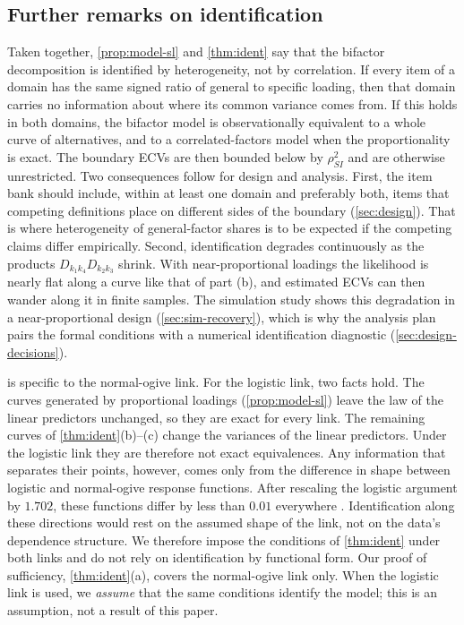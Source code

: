 \subsection{Further remarks on identification}\label{app:pm-remarks-ident}

\begin{remark}\label{rem:id-heterogeneity}
Taken together, \cref{prop:model-sl} and \cref{thm:ident} say that the bifactor decomposition is identified by heterogeneity, not by correlation. If every item of a domain has the same signed ratio of general to specific loading, then that domain carries no information about where its common variance comes from. If this holds in both domains, the bifactor model is observationally equivalent to a whole curve of alternatives, and to a correlated-factors model when the proportionality is exact. The boundary ECVs are then bounded below by $\rho_{SI}^2$ and are otherwise unrestricted. Two consequences follow for design and analysis. First, the item bank should include, within at least one domain and preferably both, items that competing definitions place on different sides of the boundary (\cref{sec:design}). That is where heterogeneity of general-factor shares is to be expected if the competing claims differ empirically. Second, identification degrades continuously as the products $D_{k_1k_4}D_{k_2k_3}$ shrink. With near-proportional loadings the likelihood is nearly flat along a curve like that of part (b), and estimated ECVs can then wander along it in finite samples. The simulation study shows this degradation in a near-proportional design (\cref{sec:sim-recovery}), which is why the analysis plan pairs the formal conditions with a numerical identification diagnostic (\cref{sec:design-decisions}).
\end{remark}

\begin{remark}\label{rem:id-logit}
 is specific to the normal-ogive link. For the logistic link, two facts hold. The curves generated by proportional loadings (\cref{prop:model-sl}) leave the law of the linear predictors unchanged, so they are exact for every link. The remaining curves of \cref{thm:ident}(b)--(c) change the variances of the linear predictors. Under the logistic link they are therefore not exact equivalences. Any information that separates their points, however, comes only from the difference in shape between logistic and normal-ogive response functions. After rescaling the logistic argument by $1.702$, these functions differ by less than $0.01$ everywhere \citep{camilli1994}. Identification along these directions would rest on the assumed shape of the link, not on the data's dependence structure. We therefore impose the conditions of \cref{thm:ident} under both links and do not rely on identification by functional form. Our proof of sufficiency, \cref{thm:ident}(a), covers the normal-ogive link only. When the logistic link is used, we \emph{assume} that the same conditions identify the model; this is an assumption, not a result of this paper.
\end{remark}

